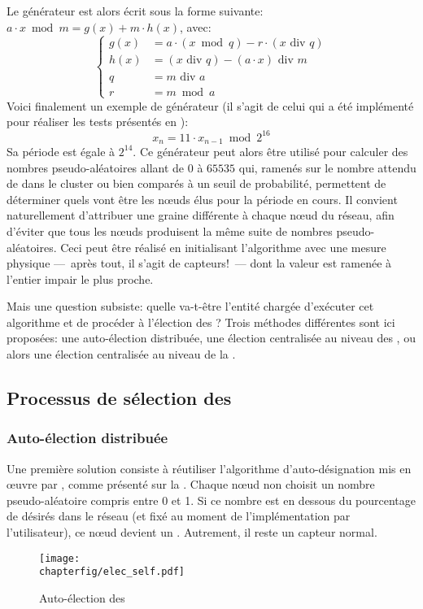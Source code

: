 Le générateur est alors écrit sous la forme suivante: $a\cdot x\bmod m=g(x)+m\cdot h(x)$, avec:
\[\left\{
    \begin{aligned}
        g(x) & =a\cdot(x\bmod q)-r\cdot(x\mbox{~div~}q)\\
        h(x) & =(x\mbox{~div~}q)-(a\cdot x)\mbox{~div~}m\\
        q    & =m\mbox{~div~}a\\
        r    & =m\bmod a
    \end{aligned}
\right.\]
Voici finalement un exemple de générateur (il s'agit de celui qui a été implémenté pour réaliser les tests présentés en ):
\[x_n=11\cdot x_{n-1}\bmod2^{16}\]
Sa période est égale à $2^{14}$.
Ce générateur peut alors être utilisé pour calculer des nombres pseudo-aléatoires allant de $0$ à $65535$ qui, ramenés sur le nombre attendu de \cns dans le cluster ou bien comparés à un seuil de probabilité, permettent de déterminer quels vont être les nœuds élus pour la période en cours.
Il convient naturellement d'attribuer une graine différente à chaque nœud du réseau, afin d'éviter que tous les nœuds produisent la même suite de nombres pseudo-aléatoires.
Ceci peut être réalisé en initialisant l'algorithme avec une mesure physique ---~après tout, il s'agit de capteurs!~--- dont la valeur est ramenée à l'entier impair le plus proche.

Mais une question subsiste: quelle va-t-être l'entité chargée d'exécuter cet algorithme et de procéder à l'élection des \cns?
Trois méthodes différentes sont ici proposées: une auto-élection distribuée, une élection centralisée au niveau des \CH, ou alors une élection centralisée au niveau de la \sdb.
    \subsection{Processus de sélection des \cns}

        \subsubsection{Auto-élection distribuée}
Une première solution consiste à réutiliser l'algorithme d'auto-désignation mis en œuvre par \leach, comme présenté sur la .
Chaque nœud non \CH choisit un nombre pseudo-aléatoire compris entre 0 et 1.
Si ce nombre est en dessous du pourcentage de \cns désirés dans le réseau (et fixé au moment de l'implémentation par l'utilisateur), ce nœud devient un \cn.
Autrement, il reste un capteur normal.
\begin{figure}[ht]
    \centering
    \texttt{[image: \\chapterfig/elec\_self.pdf]}
    \caption{Auto-élection des \cns}\label{sa:fig:elecself}
\end{figure}


